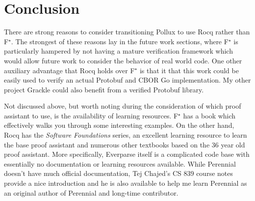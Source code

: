 \documentclass[11pt]{article}
\newcommand{\fstar}{F$^\star$}
\begin{document}
\section{Conclusion}

There are strong reasons to consider transitioning Pollux to use Rocq rather
than \fstar{}. The strongest of these reasons lay in the future work sections,
where \fstar{} is particularly hampered by not having a mature verification
framework which would allow future work to consider the behavior of real world
code. One other auxiliary advantage that Rocq holds over \fstar{} is that it
that this work could be easily used to verify an actual Protobuf and CBOR Go
implementation. My other project Grackle could also benefit from a verified
Protobuf library.

Not discussed above, but worth noting during the consideration of which proof
assistant to use, is the availability of learning resources. \fstar{} has a book
which effectively walks you through some interesting examples. On the other
hand, Rocq has the \emph{Software Foundations} series, an excellent learning
resource to learn the base proof assistant and numerous other textbooks based on
the 36 year old proof assistant. More specifically, Everparse itself is a
complicated code base with essentially no documentation or learning resources
available. While Perennial doesn't have much official documentation, Tej
Chajed's CS 839 course notes provide a nice introduction and he is also
available to help me learn Perennial as an original author of Perennial and
long-time contributor.

\printbibliography{}
\end{document}
